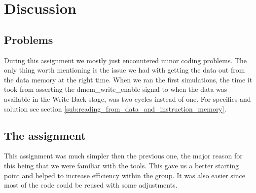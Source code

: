 \section{Discussion} %
\label{sec:discussion}
\subsection{Problems}
During this assignment we mostly just encountered minor coding problems. The only thing worth mentioning is the issue we had with getting the data out from the data memory at the right time. When we ran the first simulations, the time it took from asserting the dmem\_write\_enable signal to when the data was available in the Write-Back stage, was two cycles instead of one. For specifics and solution see section \ref{sub:reading_from_data_and_instruction_memory}.

\subsection{The assignment}
This assignment was much simpler then the previous one, the major reason for this being that we were familiar with the tools. This gave us a better starting point and helped to increase efficiency within the group. It was also easier since most of the code could be reused with some adjustments.

